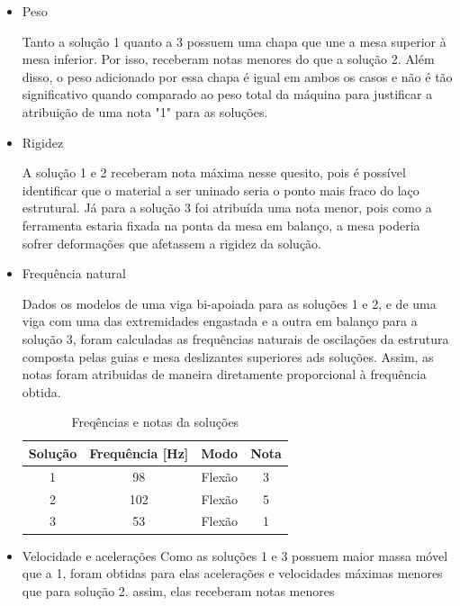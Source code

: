 \begin{itemize}
    \item Peso
    
    Tanto a solução 1 quanto a 3 possuem uma chapa que une a mesa superior à mesa inferior. Por isso, receberam notas menores do que a solução 2. Além disso, o peso adicionado por essa chapa é igual em ambos os casos e não é tão significativo quando comparado ao peso total da máquina para justificar a atribuição de uma nota "1" para as soluções. 
    
    \item Rigidez
    
    A solução 1 e 2 receberam nota máxima nesse quesito, pois é possível identificar que o material a ser uninado seria o ponto mais fraco do laço estrutural. Já para a solução 3 foi atribuída uma nota menor, pois como a ferramenta estaria fixada na ponta da mesa em balanço, a mesa poderia sofrer deformações que afetassem a rigidez da solução.
    
    \item Frequência natural
    
    Dados os modelos de uma viga bi-apoiada para as soluções 1 e 2, e de uma viga com uma das extremidades engastada e a outra em balanço para a solução 3, foram calculadas as frequências naturais de oscilações da estrutura composta pelas guias e mesa deslizantes superiores ads soluções. Assim, as notas foram atribuidas de maneira diretamente proporcional à frequência obtida.

    
    \begin{table}
        \centering
        \begin{tabular}{|c|c|c|c|} \hline 
             Solução&  Frequência [Hz]&  Modo& Nota\\ \hline 
             1&  98&  Flexão& 3\\ \hline 
 2& 102& Flexão&5\\ \hline 
             3&  53&  Flexão& 1\\ \hline
        \end{tabular}
        \caption{Freqências e notas da soluções}
        \label{tab:freq_not}
    \end{table}
    
    \item Velocidade e acelerações
    Como as soluções 1 e 3 possuem maior massa móvel que a 1, foram obtidas para elas acelerações e velocidades máximas menores que para solução 2. assim, elas receberam notas menores
    

\end{itemize}
